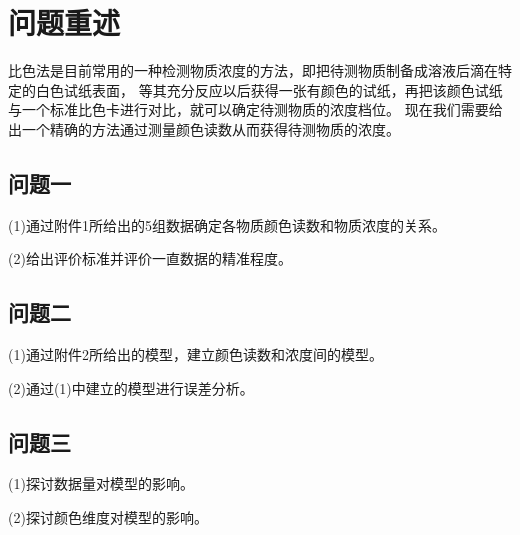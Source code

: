 \section{问题重述}
比色法是目前常用的一种检测物质浓度的方法，即把待测物质制备成溶液后滴在特定的白色试纸表面，
等其充分反应以后获得一张有颜色的试纸，再把该颜色试纸与一个标准比色卡进行对比，就可以确定待测物质的浓度档位。
现在我们需要给出一个精确的方法通过测量颜色读数从而获得待测物质的浓度。
\subsection{问题一}
(1)通过附件1所给出的5组数据确定各物质颜色读数和物质浓度的关系。

(2)给出评价标准并评价一直数据的精准程度。

\subsection{问题二}
(1)通过附件2所给出的模型，建立颜色读数和浓度间的模型。

(2)通过(1)中建立的模型进行误差分析。

\subsection{问题三}
(1)探讨数据量对模型的影响。

(2)探讨颜色维度对模型的影响。

